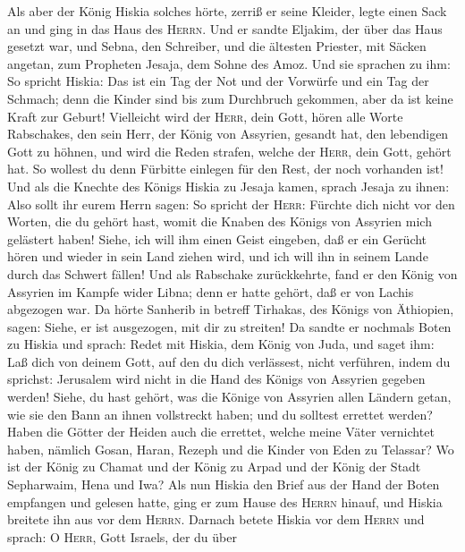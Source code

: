  Als aber der König Hiskia solches hörte, zerriß er seine
Kleider, legte einen Sack an und ging in das Haus des \textsc{Herrn}.
 Und er sandte Eljakim, der über das Haus gesetzt war, und
Sebna, den Schreiber, und die ältesten Priester, mit Säcken angetan, zum
Propheten Jesaja, dem Sohne des Amoz.  Und sie sprachen zu
ihm: So spricht Hiskia: Das ist ein Tag der Not und der Vorwürfe und ein
Tag der Schmach; denn die Kinder sind bis zum Durchbruch gekommen, aber
da ist keine Kraft zur Geburt!  Vielleicht wird der
\textsc{Herr}, dein Gott, hören alle Worte Rabschakes, den sein Herr,
der König von Assyrien, gesandt hat, den lebendigen Gott zu höhnen, und
wird die Reden strafen, welche der \textsc{Herr}, dein Gott, gehört hat.
So wollest du denn Fürbitte einlegen für den Rest, der noch vorhanden
ist!  Und als die Knechte des Königs Hiskia zu Jesaja
kamen,  sprach Jesaja zu ihnen: Also sollt ihr eurem Herrn
sagen: So spricht der \textsc{Herr}: Fürchte dich nicht vor den Worten,
die du gehört hast, womit die Knaben des Königs von Assyrien mich
gelästert haben!  Siehe, ich will ihm einen Geist
eingeben, daß er ein Gerücht hören und wieder in sein Land ziehen wird,
und ich will ihn in seinem Lande durch das Schwert fällen!
 Und als Rabschake zurückkehrte, fand er den König von
Assyrien im Kampfe wider Libna; denn er hatte gehört, daß er von Lachis
abgezogen war.  Da hörte Sanherib in betreff Tirhakas, des
Königs von Äthiopien, sagen: Siehe, er ist ausgezogen, mit dir zu
streiten! Da sandte er nochmals Boten zu Hiskia und sprach:
 Redet mit Hiskia, dem König von Juda, und saget ihm: Laß
dich von deinem Gott, auf den du dich verlässest, nicht verführen, indem
du sprichst: Jerusalem wird nicht in die Hand des Königs von Assyrien
gegeben werden!  Siehe, du hast gehört, was die Könige
von Assyrien allen Ländern getan, wie sie den Bann an ihnen vollstreckt
haben; und du solltest errettet werden?  Haben die Götter
der Heiden auch die errettet, welche meine Väter vernichtet haben,
nämlich Gosan, Haran, Rezeph und die Kinder von Eden zu Telassar?
 Wo ist der König zu Chamat und der König zu Arpad und
der König der Stadt Sepharwaim, Hena und Iwa?  Als nun
Hiskia den Brief aus der Hand der Boten empfangen und gelesen hatte,
ging er zum Hause des \textsc{Herrn} hinauf, und Hiskia breitete ihn aus
vor dem \textsc{Herrn}.  Darnach betete Hiskia vor dem
\textsc{Herrn} und sprach: O \textsc{Herr}, Gott Israels, der du über
